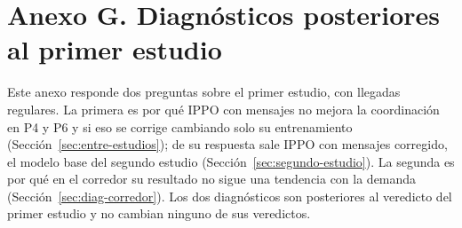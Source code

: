 \section*{Anexo G. Diagnósticos posteriores al primer estudio}
{}
\setcounter{table}{0}
\renewcommand{\thetable}{G.\arabic{table}}
\renewcommand{\theHtable}{G.\arabic{table}}
\setcounter{figure}{0}
\renewcommand{\thefigure}{G.\arabic{figure}}
\renewcommand{\theHfigure}{G.\arabic{figure}}
\setcounter{equation}{0}
\renewcommand{\theequation}{G.\arabic{equation}}
\renewcommand{\theHequation}{G.\arabic{equation}}

Este anexo responde dos preguntas sobre el primer estudio, con llegadas
regulares. La primera es por qué IPPO con mensajes no mejora la
coordinación en P4 y P6 y si eso se corrige cambiando solo su
entrenamiento (Sección~\ref{sec:entre-estudios}); de su respuesta sale
IPPO con mensajes corregido, el modelo base del segundo estudio
(Sección~\ref{sec:segundo-estudio}). La segunda es por qué en el
corredor su resultado no sigue una tendencia con la demanda
(Sección~\ref{sec:diag-corredor}). Los dos diagnósticos son posteriores
al veredicto del primer estudio y no cambian ninguno de sus veredictos.

